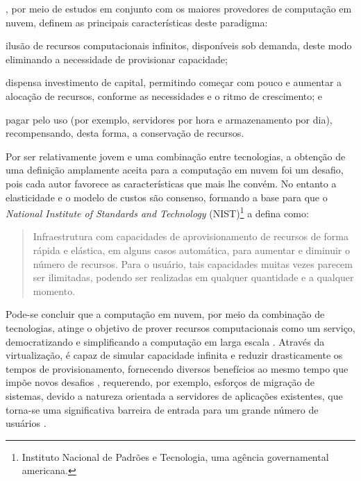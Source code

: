 \documentclass[english,brazilian]{UNISINOSmonografia} %
\begin{document}
, por meio de estudos em conjunto com os maiores provedores de computação em nuvem, definem as principais características deste paradigma:
\begin{inparaenum}
	\item ilusão de recursos computacionais infinitos, disponíveis sob demanda, deste modo eliminando a necessidade de provisionar capacidade;
	\item dispensa investimento de capital, permitindo começar com pouco e aumentar a alocação de recursos, conforme as necessidades e o ritmo de crescimento; e
	\item pagar pelo uso (por exemplo, servidores por hora e armazenamento por dia), recompensando, desta forma, a conservação de recursos.
\end{inparaenum}



Por ser relativamente jovem e uma combinação entre tecnologias, a obtenção de uma definição amplamente aceita para a computação em nuvem foi um desafio, pois cada autor favorece as características que mais lhe convém.
No entanto a elasticidade e o modelo de custos são consenso, formando a base para que o \textit{National Institute of Standards and Technology} (NIST)\footnote{
	Instituto Nacional de Padrões e Tecnologia, uma agência governamental americana.
} a defina como:

\begin{quote}
	Infraestrutura com capacidades de aprovisionamento de recursos de forma rápida e elástica, em alguns
	casos automática, para aumentar e diminuir o número de recursos. Para o usuário, tais capacidades muitas vezes
	parecem ser ilimitadas, podendo ser realizadas em qualquer quantidade e a qualquer momento.
\end{quote}

Pode-se concluir que a computação em nuvem, por meio da combinação de tecnologias, atinge o objetivo de prover recursos computacionais como um serviço, democratizando e simplificando a computação em larga escala \cite{Awada2017}.
Através da virtualização, é capaz de simular capacidade infinita e reduzir drasticamente os tempos de provisionamento, fornecendo diversos benefícios ao mesmo tempo que impõe novos desafios \cite{Zhang2010}, requerendo, por exemplo, esforços de migração de sistemas, devido a natureza orientada a servidores de aplicações existentes, que torna-se uma significativa barreira de entrada para um grande número de usuários \cite{Jonas2017}.
\end{document}

